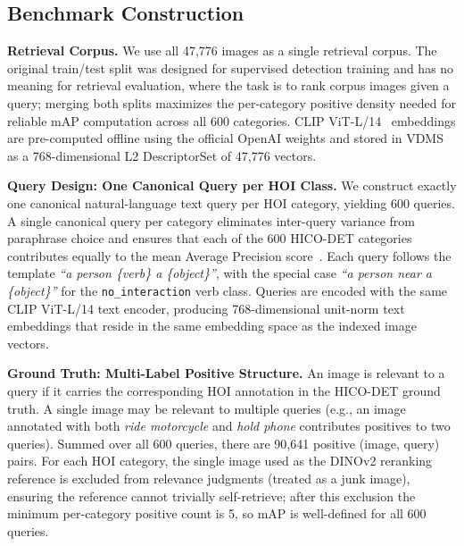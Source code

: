 \documentclass[sigconf, nonacm]{acmart}
\theoremstyle{definition}
\begin{document}
\subsection{Benchmark Construction}
\noindent\textbf{Retrieval Corpus.}
We use all 47{,}776 images as a single retrieval corpus.
The original train/test split was designed for supervised detection training and has
no meaning for retrieval evaluation, where the task is to rank corpus images given a
query; merging both splits maximizes the per-category positive density needed for
reliable mAP computation across all 600 categories.
CLIP ViT-L/14~\cite{radford2021clip} embeddings are pre-computed offline using the
official OpenAI weights and stored in VDMS as a 768-dimensional L2 DescriptorSet
of 47{,}776 vectors.

\noindent\textbf{Query Design: One Canonical Query per HOI Class.}
We construct exactly one canonical natural-language text query per HOI category,
yielding 600 queries.
A single canonical query per category eliminates inter-query variance from paraphrase
choice and ensures that each of the 600 HICO-DET categories contributes equally to
the mean Average Precision score~\cite{manning2008ir}.
Each query follows the template \textit{``a person \{verb\} a \{object\}''}, with the
special case \textit{``a person near a \{object\}''} for the \texttt{no\_interaction}
verb class.
Queries are encoded with the same CLIP ViT-L/14 text encoder, producing
768-dimensional unit-norm text embeddings that reside in the same embedding space as
the indexed image vectors.

\noindent\textbf{Ground Truth: Multi-Label Positive Structure.}
An image is relevant to a query if it carries the corresponding HOI annotation in
the HICO-DET ground truth.
A single image may be relevant to multiple queries (e.g., an image annotated with both
\textit{ride motorcycle} and \textit{hold phone} contributes positives to two queries).
Summed over all 600 queries, there are 90{,}641 positive (image, query) pairs.
For each HOI category, the single image used as the DINOv2 reranking reference
is excluded from relevance judgments (treated as a junk image), ensuring the
reference cannot trivially self-retrieve; after this exclusion the minimum
per-category positive count is 5, so mAP is well-defined for all 600 queries.
\end{document}
